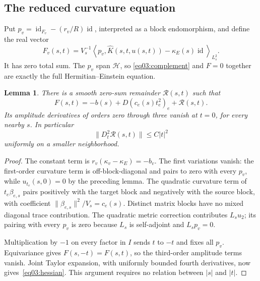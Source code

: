 \documentclass[11pt]{amsart}
\newtheorem{lemma}[theorem]{Lemma}
\theoremstyle{definition}
\theoremstyle{remark}
\newcommand{\id}{\operatorname{id}}
\newcommand{\HH}{\mathcal H}
\newcommand{\cR}{\mathcal R}
\begin{document}
\subsection{The reduced curvature equation}

Put \(p_v=\id_{F_v}-(r_v/R)\id\), interpreted as a block
endomorphism, and define the real vector
\begin{equation}\label{eq03:reduced}
 F_v(s,t)=V_s^{-1}
 \left\langle p_v,\widehat K(s,t,u(s,t))-\kappa_E(s)\id
 \right\rangle_{L^2_s}.
\end{equation}
It has zero total sum. The \(p_v\) span \(\HH\), so
\eqref{eq03:complement} and \(F=0\) together are exactly the full
Hermitian--Einstein equation.

\begin{lemma}\label{lem03:expansion}
There is a smooth zero-sum remainder \(\cR(s,t)\) such that
\begin{equation}\label{eq03:expansion}
 F(s,t)=-b(s)+D(c_e(s)t_e^2)_e+\cR(s,t).
\end{equation}
Its amplitude derivatives of orders zero through three vanish at
\(t=0\), for every nearby \(s\). In particular
\begin{equation}\label{eq03:hessian}
 \|D_t^2\cR(s,t)\|\leq C|t|^2
\end{equation}
uniformly on a smaller neighborhood.
\end{lemma}

\begin{proof}
The constant term is \(r_v(\kappa_v-\kappa_E)=-b_v\).
The first variations vanish: the first-order curvature term is
off-block-diagonal and pairs to zero with every \(p_v\), while
\(u_{t_e}(s,0)=0\) by the preceding lemma.
The quadratic curvature term of \(t_e\beta_{e,s}\)
pairs positively with the target block and negatively with
the source block, with coefficient
\(\|\beta_{e,s}\|^2/V_s=c_e(s)\).
Distinct matrix blocks have no mixed diagonal trace contribution.
The quadratic metric correction contributes \(L_su_2\);
its pairing with every \(p_v\) is zero because \(L_s\) is
self-adjoint and \(L_sp_v=0\).

Multiplication by \(-1\) on every factor in \(I\) sends
\(t\) to \(-t\) and fixes all \(p_v\).
Equivariance gives \(F(s,-t)=F(s,t)\), so the third-order
amplitude terms vanish. Joint Taylor expansion, with uniformly
bounded fourth derivatives, now gives~\eqref{eq03:hessian}.
This argument requires no relation between \(|s|\) and \(|t|\).
\end{proof}
\end{document}
